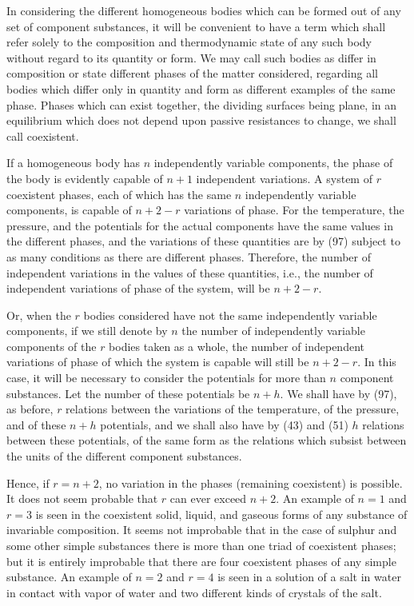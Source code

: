 \documentclass[11pt]{article}
\begin{document}
In considering the different homogeneous bodies which can be formed out of any set of component substances, it will be convenient to have a term which shall refer solely to the composition and thermodynamic state of any such body without regard to its quantity or form. We may call such bodies as differ in composition or state different phases of the matter considered, regarding all bodies which differ only in quantity and form as different examples of the same phase. Phases which can exist together, the dividing surfaces being plane, in an equilibrium which does not depend upon passive resistances to change, we shall call coexistent.

If a homogeneous body has \(n\) independently variable components, the phase of the body is evidently capable of \(n+1\) independent variations. A system of \(r\) coexistent phases, each of which has the same \(n\) independently variable components, is capable of \(n+2-r\) variations of phase. For the temperature, the pressure, and the potentials for the actual components have the same values in the different phases, and the variations of these quantities are by (97) subject to as many conditions as there are different phases. Therefore, the number of independent variations in the values of these quantities, i.e., the number of independent variations of phase of the system, will be \(n+2-r\).

Or, when the \(r\) bodies considered have not the same independently variable components, if we still denote by \(n\) the number of independently variable components of the \(r\) bodies taken as a whole, the number of independent variations of phase of which the system is capable will still be \(n+2-r\). In this case, it will be necessary to consider the potentials for more than \(n\) component substances. Let the number of these potentials be \(n+h\). We shall have by (97), as before, \(r\) relations between the variations of the temperature, of the pressure, and of these \(n+h\) potentials, and we shall also have by (43) and (51) \(h\) relations between these potentials, of the same form as the relations which subsist between the units of the different component substances.

Hence, if \(r=n+2\), no variation in the phases (remaining coexistent) is possible. It does not seem probable that \(r\) can ever exceed \(n+2\). An example of \(n=1\) and \(r=3\) is seen in the coexistent solid, liquid, and gaseous forms of any substance of invariable composition. It seems not improbable that in the case of sulphur and some other simple substances there is more than one triad of coexistent phases; but it is entirely improbable that there are four coexistent phases of any simple substance. An example of \(n=2\) and \(r=4\) is seen in a solution of a salt in water in contact with vapor of water and two different kinds of crystals of the salt.
\end{document}

